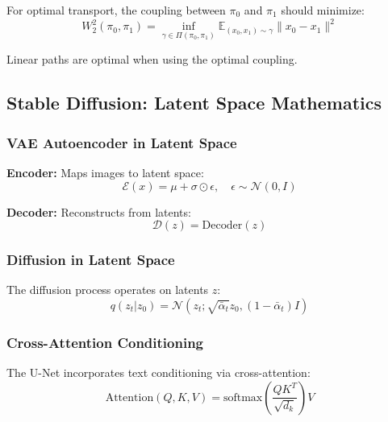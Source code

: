 \documentclass[a4paper,12pt]{article}
\begin{document}
For optimal transport, the coupling between $\pi_0$ and $\pi_1$ should minimize:
\begin{equation}
W_2^2(\pi_0, \pi_1) = \inf_{\gamma \in \Pi(\pi_0, \pi_1)} \mathbb{E}_{(x_0, x_1) \sim \gamma} \|x_0 - x_1\|^2
\label{eq:ot_cost}
\end{equation}

Linear paths are optimal when using the optimal coupling.

\subsection{Stable Diffusion: Latent Space Mathematics}

\subsubsection{VAE Autoencoder in Latent Space}

\textbf{Encoder:} Maps images to latent space:
\begin{equation}
\mathcal{E}(x) = \mu + \sigma \odot \epsilon, \quad \epsilon \sim \mathcal{N}(0, I)
\label{eq:vae_encoder}
\end{equation}

\textbf{Decoder:} Reconstructs from latents:
\begin{equation}
\mathcal{D}(z) = \text{Decoder}(z)
\label{eq:vae_decoder}
\end{equation}

\subsubsection{Diffusion in Latent Space}

The diffusion process operates on latents $z$:
\begin{equation}
q(z_t | z_0) = \mathcal{N}(z_t; \sqrt{\bar{\alpha}_t} z_0, (1 - \bar{\alpha}_t) I)
\label{eq:latent_diffusion}
\end{equation}

\subsubsection{Cross-Attention Conditioning}

The U-Net incorporates text conditioning via cross-attention:
\begin{equation}
\text{Attention}(Q, K, V) = \text{softmax}\left(\frac{QK^T}{\sqrt{d_k}}\right) V
\label{eq:cross_attention}
\end{equation}
\end{document}
